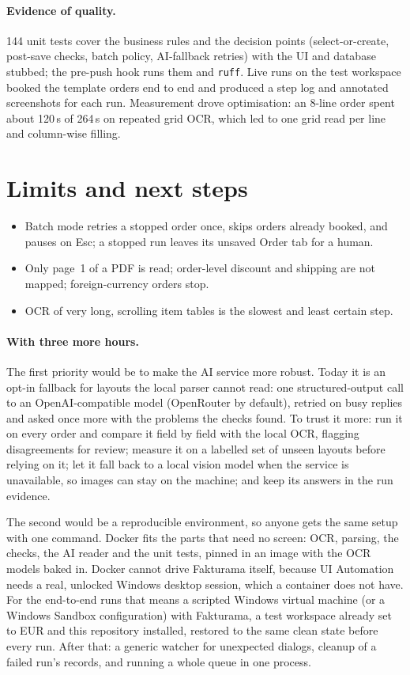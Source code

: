\documentclass[11pt,a4paper]{article}
\begin{document}
\paragraph{Evidence of quality.} 144 unit tests cover the business rules and the decision points (select-or-create,
post-save checks, batch policy, AI-fallback retries) with the UI and database stubbed; the pre-push hook runs them and
\texttt{ruff}. Live runs on the test workspace booked the template orders end to end and produced a step log and
annotated screenshots for each run. Measurement drove optimisation: an 8-line order spent about 120\,s of 264\,s on
repeated grid OCR, which led to one grid read per line and column-wise filling.

\section{Limits and next steps}
\begin{itemize}
  \item Batch mode retries a stopped order once, skips orders already booked, and pauses on Esc; a stopped run leaves
        its unsaved Order tab for a human.
  \item Only page~1 of a PDF is read; order-level discount and shipping are not mapped; foreign-currency orders stop.
  \item OCR of very long, scrolling item tables is the slowest and least certain step.
\end{itemize}

\paragraph{With three more hours.} The first priority would be to make the AI service more robust. Today it is an
opt-in fallback for layouts the local parser cannot read: one structured-output call to an OpenAI-compatible model
(OpenRouter by default), retried on busy replies and asked once more with the problems the checks found. To trust it
more: run it on every order and compare it field by field with the local OCR, flagging disagreements for review;
measure it on a labelled set of unseen layouts before relying on it; let it fall back to a local vision model when the
service is unavailable, so images can stay on the machine; and keep its answers in the run evidence.

The second would be a reproducible environment, so anyone gets the same setup with one command. Docker fits the parts
that need no screen: OCR, parsing, the checks, the AI reader and the unit tests, pinned in an image with the OCR models
baked in. Docker cannot drive Fakturama itself, because UI Automation needs a real, unlocked Windows desktop session,
which a container does not have. For the end-to-end runs that means a scripted Windows virtual machine (or a Windows
Sandbox configuration) with Fakturama, a test workspace already set to EUR and this repository installed, restored to
the same clean state before every run. After that: a generic watcher for unexpected dialogs, cleanup of a failed run's
records, and running a whole queue in one process.
\end{document}
